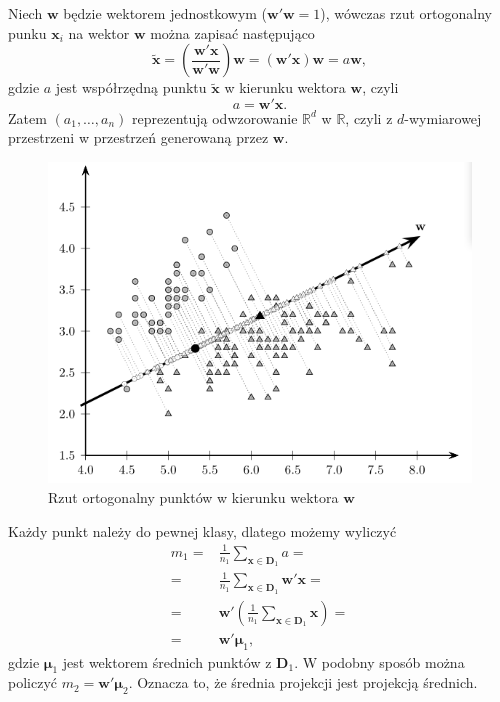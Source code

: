 \documentclass[
]{book}
\theoremstyle{plain}
\theoremstyle{definition}
\theoremstyle{definition}
\theoremstyle{definition}
\theoremstyle{definition}
\theoremstyle{definition}
\theoremstyle{remark}
\begin{document}
Niech \(\boldsymbol w\) będzie wektorem jednostkowym (\(\boldsymbol w'\boldsymbol w=1\)), wówczas rzut ortogonalny punku \(\boldsymbol x_i\) na wektor \(\boldsymbol w\) można zapisać następująco
\begin{equation}
    \tilde{\boldsymbol x}=\left(\frac{\boldsymbol w'\boldsymbol x}{\boldsymbol w'\boldsymbol w}\right)\boldsymbol w=(\boldsymbol w'\boldsymbol x)\boldsymbol w = a\boldsymbol w,
\end{equation}
gdzie \(a\) jest współrzędną punktu \(\tilde{\boldsymbol x}\) w kierunku wektora \(\boldsymbol w\), czyli
\begin{equation}
    a=\boldsymbol w'\boldsymbol x.
\end{equation}
Zatem \((a_1,\ldots,a_n)\) reprezentują odwzorowanie \(\mathbb{R}^d\) w \(\mathbb{R}\), czyli z \(d\)-wymiarowej przestrzeni w przestrzeń generowaną przez \(\boldsymbol w\).

\begin{figure}

{\centering \includegraphics[width=5.83in]{images/rzut} 

}

\caption{Rzut ortogonalny punktów w kierunku wektora $\boldsymbol w$}\label{fig:rzut}
\end{figure}

Każdy punkt należy do pewnej klasy, dlatego możemy wyliczyć
\begin{align}
    m_1=&\frac{1}{n_1}\sum_{ \boldsymbol x\in \boldsymbol D_1}a=\\
    =&\frac{1}{n_1}\sum_{ \boldsymbol x\in \boldsymbol D_1} \boldsymbol w' \boldsymbol x=\\
    =& \boldsymbol w'\left(\frac{1}{n_1}\sum_{ \boldsymbol x\in \boldsymbol D_1} \boldsymbol x \right)=\\
    =& \boldsymbol w' \boldsymbol{\mu}_1,
    \label{eq:m}
\end{align}
gdzie \(\boldsymbol \mu_1\) jest wektorem średnich punktów z \(\boldsymbol D_1\). W podobny sposób można policzyć \(m_2 = \boldsymbol w' \boldsymbol \mu_2\). Oznacza to, że średnia projekcji jest projekcją średnich.
\end{document}
